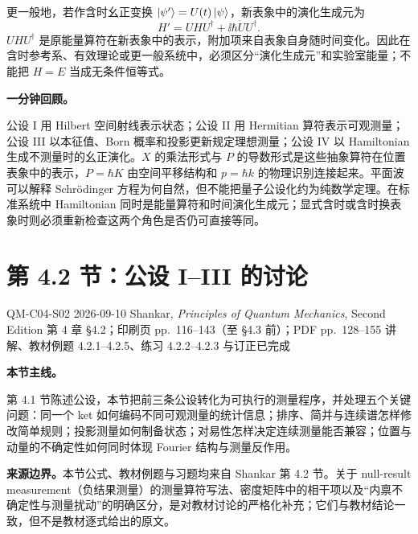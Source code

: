 更一般地，若作含时幺正变换 $\left|\psi'\right\rangle=U(t)\left|\psi\right\rangle$，新表象中的演化生成元为
\begin{equation}
  \boxed{
  H'=UHU^\dagger+\ii\hbar\dot U U^\dagger.}
  \label{eq:QM-C04-S01-time-dependent-frame-hamiltonian}
\end{equation}
$UHU^\dagger$ 是原能量算符在新表象中的表示，附加项来自表象自身随时间变化。因此在含时参考系、有效理论或更一般系统中，必须区分“演化生成元”和实验室能量；不能把 $H=E$ 当成无条件恒等式。

\textbf{一分钟回顾。}

公设 I 用 Hilbert 空间射线表示状态；公设 II 用 Hermitian 算符表示可观测量；公设 III 以本征值、Born 概率和投影更新规定理想测量；公设 IV 以 Hamiltonian 生成不测量时的幺正演化。$X$ 的乘法形式与 $P$ 的导数形式是这些抽象算符在位置表象中的表示，$P=\hbar K$ 由空间平移结构和 $p=\hbar k$ 的物理识别连接起来。平面波可以解释 Schrödinger 方程为何自然，但不能把量子公设化约为纯数学定理。在标准系统中 Hamiltonian 同时是能量算符和时间演化生成元；显式含时或含时换表象时则必须重新检查这两个角色是否仍可直接等同。

\section{第 4.2 节：公设 I--III 的讨论}
\label{section:QM-C04-S02}

\studymeta
  {QM-C04-S02}
  {2026-09-10}
  {Shankar, \textit{Principles of Quantum Mechanics}, Second Edition}
  {第 4 章 \S 4.2；印刷页 pp.~116--143（至 \S 4.3 前）；PDF pp.~128--155}
  {讲解、教材例题 4.2.1--4.2.5、练习 4.2.2--4.2.3 与订正已完成}

\textbf{本节主线。}

第 4.1 节陈述公设，本节把前三条公设转化为可执行的测量程序，并处理五个关键问题：同一个 ket 如何编码不同可观测量的统计信息；排序、简并与连续谱怎样修改简单规则；投影测量如何制备状态；对易性怎样决定连续测量能否兼容；位置与动量的不确定性如何同时体现 Fourier 结构与测量反作用。

\textbf{来源边界。}本节公式、教材例题与习题均来自 Shankar 第 4.2 节。关于 null-result measurement（负结果测量）的测量算符写法、密度矩阵中的相干项以及“内禀不确定性与测量扰动”的明确区分，是对教材讨论的严格化补充；它们与教材结论一致，但不是教材逐式给出的原文。

